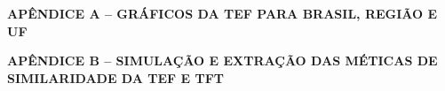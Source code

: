 \documentclass[12pt,openright,oneside,a4paper,chapter=TITLE,english,french,spanish,brazil]{abntex2}
\begin{document}
\newcommand{\subapendice}[2]{%
  \par\noindent\textbf{APÊNDICE #1 -- #2}%
  \par\vspace{0.5em}%
}

\begin{apendicesenv}

\partapendices
\noindent


\subapendice{A}{GRÁFICOS DA TEF PARA BRASIL, REGIÃO E UF}
\noindent

\FloatBarrier

\clearpage

\subapendice{B}{SIMULAÇÃO E EXTRAÇÃO DAS MÉTICAS DE SIMILARIDADE DA TEF E TFT}
\noindent


\FloatBarrier
\clearpage

\end{apendicesenv}


%


\printindex
%
\end{document}
